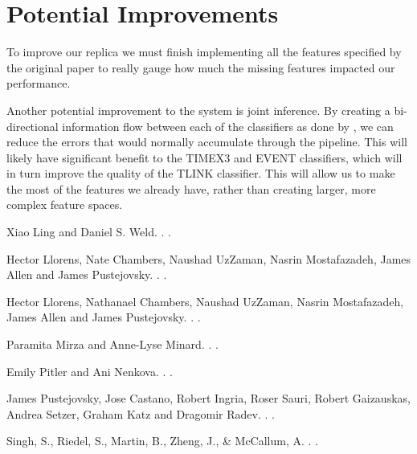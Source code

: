 \documentclass[11pt,letterpaper]{article}
\begin{document}
\section{Potential Improvements}

To improve our replica we must finish implementing all the features specified by the original paper to really gauge how much the missing features impacted our performance. 

Another potential improvement to the system is joint inference. By creating a bi-directional information flow between each of the classifiers as done by \cite{Singh:30}, we can reduce the errors that would normally accumulate through the pipeline. This will likely have significant benefit to the TIMEX3 and EVENT classifiers, which will in turn improve the quality of the TLINK classifier. This will allow us to make the most of the features we already have, rather than creating larger, more complex feature spaces.


\begin{thebibliography}{}

Xiao Ling and Daniel S. Weld.
.
.

Hector Llorens, Nate Chambers, Naushad UzZaman, Nasrin Mostafazadeh, James Allen and James Pustejovsky.
.
.

Hector Llorens, Nathanael Chambers, Naushad UzZaman, Nasrin Mostafazadeh, James Allen and James Pustejovsky.
.
.

Paramita Mirza and Anne-Lyse Minard.
.
.

Emily Pitler and Ani Nenkova.
.
.

James Pustejovsky, Jose Castano, Robert Ingria, Roser Sauri, Robert Gaizauskas, Andrea Setzer, Graham Katz and Dragomir Radev.
.
.

Singh, S., Riedel, S., Martin, B., Zheng, J., \& McCallum, A.
.
.

\end{thebibliography}
\end{document}
